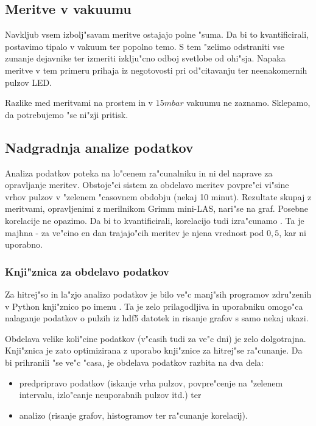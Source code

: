 \documentclass[11pt,a4paper]{article}
\begin{document}
\subsection{Meritve v vakuumu}
Navkljub vsem izbolj"savam meritve ostajajo polne "suma. Da bi to kvantificirali, postavimo tipalo v vakuum ter popolno temo. S tem "zelimo odstraniti vse zunanje dejavnike ter izmeriti izklju"cno odboj svetlobe od ohi"sja. Napaka meritve v tem primeru prihaja iz negotovosti pri od"citavanju ter neenakomernih pulzov LED.

Razlike med meritvami na prostem in v $ 15mbar $ vakuumu ne zaznamo. Sklepamo, da potrebujemo "se ni"zji pritisk.


\subsection{Nadgradnja analize podatkov}
Analiza podatkov poteka na lo"cenem ra"cunalniku in ni del naprave za opravljanje meritev. Obstoje"ci sistem za obdelavo meritev povpre"ci vi"sine vrhov pulzov v "zelenem "casovnem obdobju (nekaj 10 minut). Rezultate skupaj z meritvami, opravljenimi z merilnikom Grimm mini-LAS, nari"se na graf. Posebne korelacije ne opazimo. Da bi to kvantificirali, korelacijo tudi izra"cunamo  . Ta je majhna - za ve"cino en dan trajajo"cih meritev je njena vrednost pod $0,5$, kar ni uporabno.


\subsubsection{Knji"znica za obdelavo podatkov}
Za hitrej"so in la"zjo analizo podatkov je bilo ve"c manj"sih programov zdru"zenih v Python knji"znico po imenu . Ta je zelo prilagodljiva in uporabniku omogo"ca nalaganje podatkov o pulzih iz hdf5 \cite{hdf5} datotek in risanje grafov s samo nekaj ukazi.

Obdelava velike koli"cine podatkov (v"casih tudi za ve"c dni) je zelo dolgotrajna. Knji"znica  je zato optimizirana z uporabo knji"znice  za hitrej"se ra"cunanje. Da bi prihranili "se ve"c "casa, je obdelava podatkov razbita na dva dela:
\begin{itemize}
	\item predpripravo podatkov (iskanje vrha pulzov, povpre"cenje na "zelenem intervalu, izlo"canje neuporabnih pulzov itd.) ter
	\item analizo (risanje grafov, histogramov ter ra"cunanje korelacij).
\end{itemize}
\end{document}
